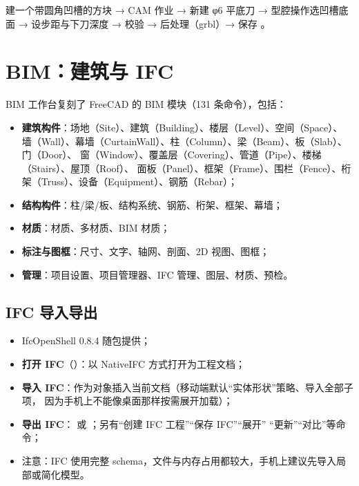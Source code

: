 \begin{practice}[练习：铣一个型腔]
建一个带圆角凹槽的方块 → CAM 作业 → 新建 φ6 平底刀 → 型腔操作选凹槽底面 → 设步距与下刀深度 →
校验 → 后处理（grbl）→ 保存 。
\end{practice}

\section{BIM：建筑与 IFC}

BIM 工作台复刻了 FreeCAD 的 BIM 模块（131 条命令），包括：

\begin{itemize}
  \item \textbf{建筑构件}：场地（Site）、建筑（Building）、楼层（Level）、空间（Space）、
        墙（Wall）、幕墙（CurtainWall）、柱（Column）、梁（Beam）、板（Slab）、门（Door）、
        窗（Window）、覆盖层（Covering）、管道（Pipe）、楼梯（Stairs）、屋顶（Roof）、
        面板（Panel）、框架（Frame）、围栏（Fence）、桁架（Truss）、设备（Equipment）、钢筋（Rebar）；
  \item \textbf{结构构件}：柱/梁/板、结构系统、钢筋、桁架、框架、幕墙；
  \item \textbf{材质}：材质、多材质、BIM 材质；
  \item \textbf{标注与图框}：尺寸、文字、轴网、剖面、2D 视图、图框；
  \item \textbf{管理}：项目设置、项目管理器、IFC 管理、图层、材质、预检。
\end{itemize}

\subsection{IFC 导入导出}

\begin{itemize}
  \item IfcOpenShell 0.8.4 随包提供；
  \item \textbf{打开 IFC}（）：以 NativeIFC 方式打开为工程文档；
  \item \textbf{导入 IFC}：作为对象插入当前文档（移动端默认“实体形状”策略、导入全部子项，
        因为手机上不能像桌面那样按需展开加载）；
  \item \textbf{导出 IFC}： 或 ；另有“创建 IFC 工程”“保存 IFC”“展开”
        “更新”“对比”等命令；
  \item 注意：IFC 使用完整 schema，文件与内存占用都较大，手机上建议先导入局部或简化模型。
\end{itemize}

